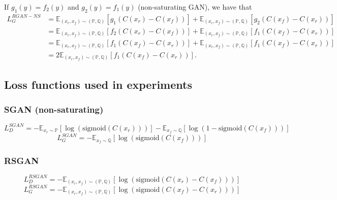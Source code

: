 \documentclass{article}
\begin{document}
If $g_1(y)=f_2(y)$ and $g_2(y)=f_1(y)$ (non-saturating GAN), we have that
\begin{align*}
L_G^{RGAN-NS} &= \mathbb{E}_{(x_r,x_f) \sim (\mathbb{P},\mathbb{Q})}\left[ g_1(C(x_r)-C(x_f)) \right] + \mathbb{E}_{(x_r,x_f) \sim (\mathbb{P},\mathbb{Q})}\left[ g_2(C(x_f)-C(x_r)) \right] \\
&= \mathbb{E}_{(x_r,x_f) \sim (\mathbb{P},\mathbb{Q})}\left[f_2(C(x_r)-C(x_f)) \right] + \mathbb{E}_{(x_r,x_f) \sim (\mathbb{P},\mathbb{Q})}\left[f_1(C(x_f)-C(x_r)) \right] \\
&= \mathbb{E}_{(x_r,x_f) \sim (\mathbb{P},\mathbb{Q})}\left[f_1(C(x_f)-C(x_r)) \right] + \mathbb{E}_{(x_r,x_f) \sim (\mathbb{P},\mathbb{Q})}\left[f_1(C(x_f)-C(x_r)) \right] \\
&= 2\mathbb{E}_{(x_r,x_f) \sim (\mathbb{P},\mathbb{Q})}\left[f_1(C(x_f)-C(x_r)) \right].
\end{align*}

\subsection{Loss functions used in experiments}

\subsubsection{SGAN (non-saturating)}

\begin{equation}
L_D^{SGAN} = -\mathbb{E}_{x_r \sim \mathbb{P}}\left[ \log\left( \text{sigmoid}(C(x_r)) \right) \right] - \mathbb{E}_{x_f \sim \mathbb{Q}} \left[ \log \left( 1-\text{sigmoid}(C(x_f)) \right) \right]
\end{equation} 
\begin{equation}
L_G^{SGAN} = -\mathbb{E}_{x_f \sim \mathbb{Q}} \left[ \log \left(\text{sigmoid}(C(x_f)) \right) \right]
\end{equation}

\subsubsection{RSGAN}

\begin{equation}
L_D^{RSGAN} = -\mathbb{E}_{(x_r,x_f) \sim (\mathbb{P},\mathbb{Q})}\left[ \log (\text{sigmoid}(C(x_r)-C(x_f))) \right]
\end{equation}
\begin{equation}
L_G^{RSGAN} = -\mathbb{E}_{(x_r,x_f) \sim (\mathbb{P},\mathbb{Q})}\left[ \log (\text{sigmoid}(C(x_f)-C(x_r))) \right]
\end{equation}
\end{document}
